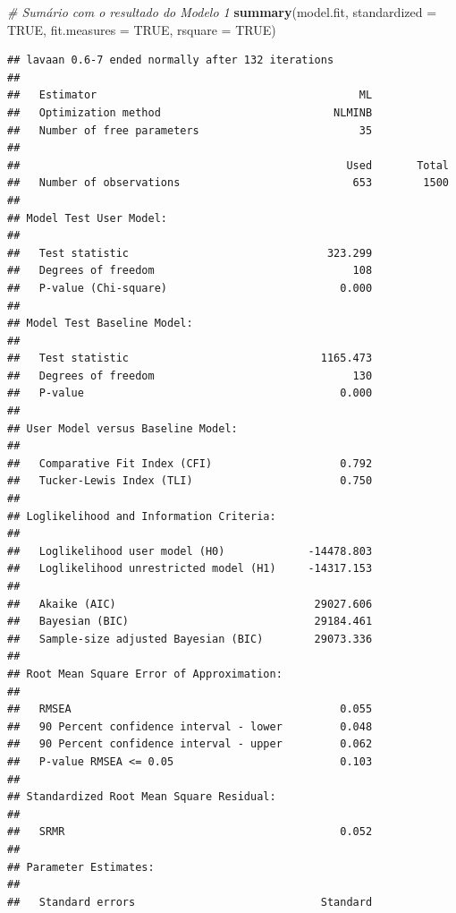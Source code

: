 \documentclass[
  12pt,
]{article}
\newenvironment{Shaded}{\begin{snugshade}}{\end{snugshade}}
\newcommand{\CommentTok}[1]{\textcolor[rgb]{0.56,0.35,0.01}{\textit{#1}}}
\newcommand{\DataTypeTok}[1]{\textcolor[rgb]{0.13,0.29,0.53}{#1}}
\newcommand{\KeywordTok}[1]{\textcolor[rgb]{0.13,0.29,0.53}{\textbf{#1}}}
\newcommand{\NormalTok}[1]{#1}
\newcommand{\OtherTok}[1]{\textcolor[rgb]{0.56,0.35,0.01}{#1}}
\begin{document}
\begin{Shaded}
\begin{Highlighting}[]
\CommentTok{\# Sumário com o resultado do Modelo 1}
\KeywordTok{summary}\NormalTok{(model.fit,}
\DataTypeTok{standardized =} \OtherTok{TRUE}\NormalTok{,}
\DataTypeTok{fit.measures =} \OtherTok{TRUE}\NormalTok{,}
\DataTypeTok{rsquare =} \OtherTok{TRUE}\NormalTok{)}
\end{Highlighting}
\end{Shaded}

\begin{verbatim}
## lavaan 0.6-7 ended normally after 132 iterations
## 
##   Estimator                                         ML
##   Optimization method                           NLMINB
##   Number of free parameters                         35
##                                                       
##                                                   Used       Total
##   Number of observations                           653        1500
##                                                                   
## Model Test User Model:
##                                                       
##   Test statistic                               323.299
##   Degrees of freedom                               108
##   P-value (Chi-square)                           0.000
## 
## Model Test Baseline Model:
## 
##   Test statistic                              1165.473
##   Degrees of freedom                               130
##   P-value                                        0.000
## 
## User Model versus Baseline Model:
## 
##   Comparative Fit Index (CFI)                    0.792
##   Tucker-Lewis Index (TLI)                       0.750
## 
## Loglikelihood and Information Criteria:
## 
##   Loglikelihood user model (H0)             -14478.803
##   Loglikelihood unrestricted model (H1)     -14317.153
##                                                       
##   Akaike (AIC)                               29027.606
##   Bayesian (BIC)                             29184.461
##   Sample-size adjusted Bayesian (BIC)        29073.336
## 
## Root Mean Square Error of Approximation:
## 
##   RMSEA                                          0.055
##   90 Percent confidence interval - lower         0.048
##   90 Percent confidence interval - upper         0.062
##   P-value RMSEA <= 0.05                          0.103
## 
## Standardized Root Mean Square Residual:
## 
##   SRMR                                           0.052
## 
## Parameter Estimates:
## 
##   Standard errors                             Standard

\end{verbatim}
\end{document}
